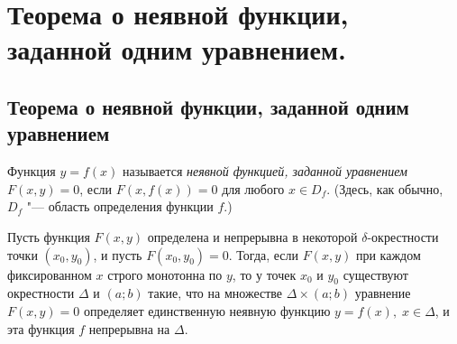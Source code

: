 \chapter[Теорема о неявной функции, заданной одним уравнением.]{Теорема о неявной функции, заданной одним уравнением\footnotemark.}
\section{Теорема о неявной функции, заданной одним уравнением}
\begin{defn}
Функция $y=f(x)$ называется \textit{неявной функцией, заданной уравнением} $F(x,y)=0$, если $F(x,f(x))=0$ для любого $x\in D_f$. (Здесь, как обычно, $D_f$ "--- область определения функции $f$.)
\end{defn}

\begin{thm}\label{yaa14th1}
Пусть функция $F(x,y)$ определена и непрерывна в некоторой $\delta$-окрестности точки $(x_0,y_0)$, и пусть $F(x_0,y_0)=0$. Тогда, если $F(x,y)$ при каждом фиксированном $x$ строго монотонна по $y$, то у точек $x_0$ и $y_0$ существуют окрестности $\Delta$ и $(a;b)$ такие, что на множестве $\Delta\times(a;b)$ уравнение $F(x,y)=0$ определяет единственную неявную функцию $y=f(x),\; x\in\Delta$, и эта функция  $f$ непрерывна на $\Delta$. 
\end{thm}

